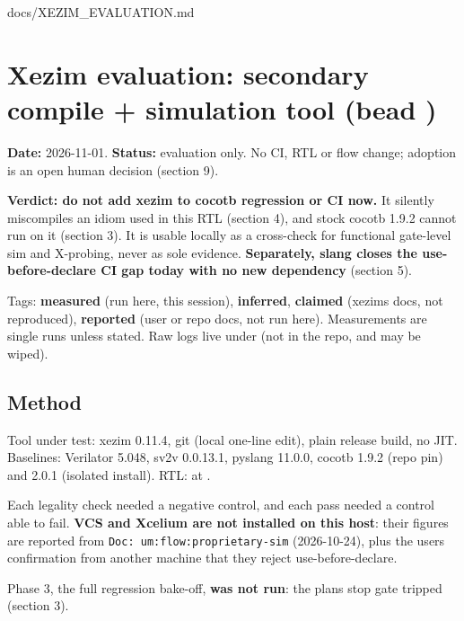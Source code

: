 \begin{relocated}{docs/XEZIM_EVALUATION.md}
\section{\texorpdfstring{Xezim evaluation: secondary compile +
simulation tool (bead
)}{Xezim evaluation: secondary compile + simulation tool (bead )}}\label{tm:dec:xezim}

\textbf{Date:} 2026-11-01. \textbf{Status:} evaluation only. No CI, RTL
or flow change; adoption is an open human decision (section 9).

\textbf{Verdict: do not add xezim to cocotb regression or CI now.} It
silently miscompiles an idiom used in this RTL (section 4), and stock
cocotb 1.9.2 cannot run on it (section 3). It is usable locally as a
cross-check for functional gate-level sim and X-probing, never as sole
evidence. \textbf{Separately, slang closes the use-before-declare CI gap
today with no new dependency} (section 5).

Tags: \textbf{measured} (run here, this session), \textbf{inferred},
\textbf{claimed} (xezim\textquotesingle s docs, not reproduced),
\textbf{reported} (user or repo docs, not run here). Measurements are
single runs unless stated. Raw logs live under
 (not in the repo, and may be wiped).

\subsection{Method}\label{tm:dec:xezim:1-method}

Tool under test: xezim 0.11.4, git  (local one-line
 edit), plain release build, no JIT. Baselines:
Verilator 5.048, sv2v 0.0.13.1, pyslang 11.0.0, cocotb 1.9.2 (repo pin)
and 2.0.1 (isolated install). RTL:  at .

Each legality check needed a negative control, and each pass needed a
control able to fail. \textbf{VCS and Xcelium are not installed on this
host}: their figures are reported from
\texttt{Doc:\allowbreak{}\ um:\allowbreak{}flow:\allowbreak{}proprietary-\allowbreak{}sim}
(2026-10-24), plus the user\textquotesingle s confirmation from another
machine that they reject use-before-declare.

Phase 3, the full regression bake-off, \textbf{was not run}: the
plan\textquotesingle s stop gate tripped (section 3).


\end{relocated}
